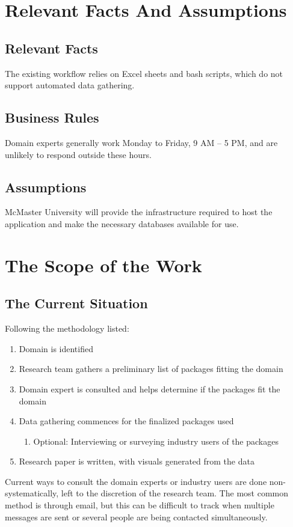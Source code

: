 \documentclass[12pt]{article}
\begin{document}
\section{Relevant Facts And Assumptions}
\subsection{Relevant Facts}
The existing workflow relies on Excel sheets and bash scripts, which do not support automated data gathering.
\subsection{Business Rules}
Domain experts generally work Monday to Friday, 9 AM – 5 PM, and are unlikely to respond outside these hours.
\subsection{Assumptions}
McMaster University will provide the infrastructure required to host the application and make the necessary databases available for use.

\section{The Scope of the Work}
\subsection{The Current Situation}
Following the methodology listed:

\begin{enumerate}
    \item Domain is identified
    \item Research team gathers a preliminary list of packages fitting the domain
    \item Domain expert is consulted and helps determine if the packages fit the domain
    \item Data gathering commences for the finalized packages used
        \begin{enumerate}
            \item Optional: Interviewing or surveying industry users of the packages
        \end{enumerate}
    \item Research paper is written, with visuals generated from the data
\end{enumerate}

Current ways to consult the domain experts or industry users are done non-systematically, left to the discretion of the research team. The most common method is through email, but this can be difficult to track when multiple messages are sent or several people are being contacted simultaneously.
\end{document}
